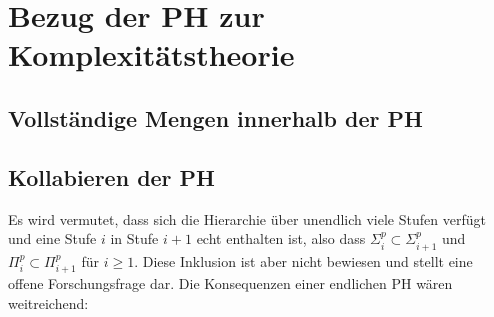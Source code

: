 \chapter{Bezug der PH zur Komplexitätstheorie} \label{chapter: Bezug der PH zur Komplexitätstheorie}
\section{Vollständige Mengen innerhalb der PH} \label{section: Vollständige Mengen innerhalb der PH}

\section{Kollabieren der PH} \label{section: Kollabieren der PH}
Es wird vermutet, dass sich die Hierarchie über unendlich viele Stufen verfügt und eine Stufe $i$ in Stufe $i + 1$ echt enthalten ist,
also dass $\Sigma^p_i \subset \Sigma^p_{i+1}$ und $\Pi^p_i \subset \Pi^p_{i+1}$ für $i \geq 1$. Diese Inklusion ist aber nicht bewiesen und stellt eine offene
Forschungsfrage dar. Die Konsequenzen einer endlichen PH wären weitreichend: